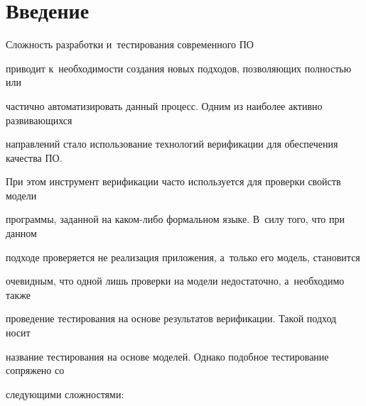 







      \thispagestyle{headings}





\section{Введение}





   Сложность разработки и~тестирования современного ПО


приводит к~необходимости создания новых подходов, позволяющих полностью или


частично автоматизировать данный процесс. Одним из наиболее активно развивающихся


направлений стало использование технологий верификации для обеспечения качества ПО.


При этом инструмент верификации часто используется для проверки свойств модели


программы, заданной на каком-либо формальном языке. В~силу того, что при данном


подходе проверяется не реализация приложения, а~только его модель, становится


очевидным, что одной лишь проверки на модели недостаточно, а~необходимо также


проведение тестирования на основе результатов верификации. Такой подход носит


название тестирования на основе моделей. Однако подобное тестирование сопряжено со


следующими сложностями:


